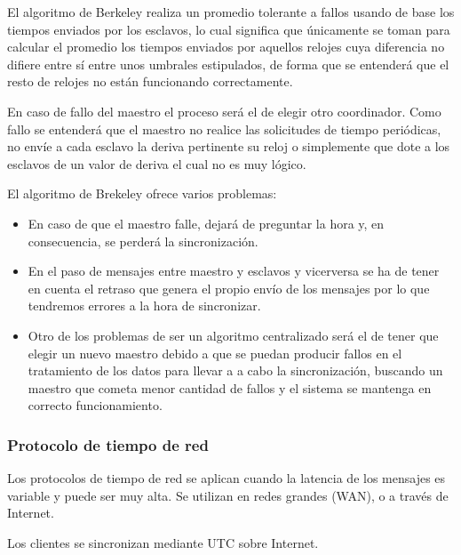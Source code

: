 \documentclass[a4paper, 11pt, titlepage]{article}
\begin{document}
            El algoritmo de Berkeley realiza un promedio tolerante a fallos usando de base los tiempos 
            enviados por los esclavos, lo cual significa que únicamente se toman para calcular el promedio 
            los tiempos enviados por aquellos relojes cuya diferencia no difiere entre sí entre unos 
            umbrales estipulados, de forma que se entenderá que el resto de relojes no están funcionando 
            correctamente.

            En caso de fallo del maestro el proceso será el de elegir otro coordinador. Como fallo se 
            entenderá que el maestro no realice las solicitudes de tiempo periódicas, no envíe a cada 
            esclavo la deriva pertinente su reloj o simplemente que dote a los esclavos de un valor de 
            deriva el cual no es muy lógico. 

            El algoritmo de Brekeley ofrece varios problemas:

            \begin{itemize}
                \item En caso de que el maestro falle, dejará de preguntar la hora y, en consecuencia, 
                se perderá la sincronización.
                \item En el paso de mensajes entre maestro y esclavos y vicerversa se ha de tener en 
                cuenta el retraso que genera el propio envío de los mensajes por lo que tendremos errores 
                a la hora de sincronizar.
                \item Otro de los problemas de ser un algoritmo centralizado será el de tener que elegir 
                un nuevo maestro debido a que se puedan producir fallos en el tratamiento de los datos 
                para llevar a a cabo la sincronización, buscando un maestro que cometa menor cantidad de 
                fallos y el sistema se mantenga en correcto funcionamiento. 
            \end{itemize}

        \subsubsection{Protocolo de tiempo de red}

            Los protocolos de tiempo de red se aplican cuando la latencia de los mensajes es variable y 
            puede ser muy alta. Se utilizan en redes grandes (WAN), o a través de Internet.

            Los clientes se sincronizan mediante UTC sobre Internet.
\end{document}
